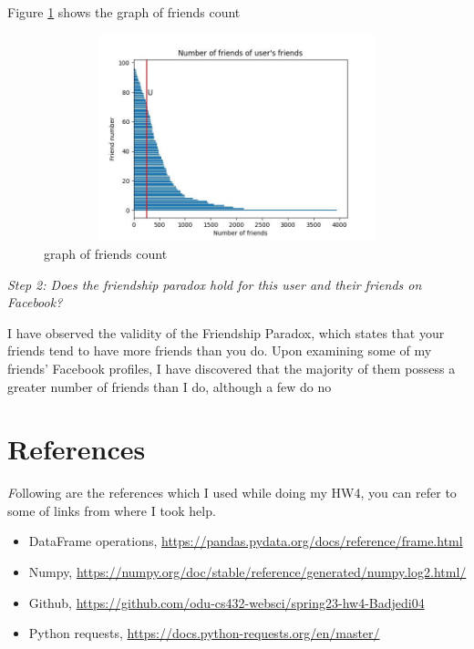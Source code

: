 \documentclass[12pt]{article}
\begin{document}
Figure \ref{fig:graph} shows the graph of friends count

\begin{figure}[h]
    \centering
    \includegraphics[trim=0 0 0 0, clip, width=1.2\textwidth,height=6cm] {1.jpeg}
    \caption{graph of friends count}
    \label{fig:graph}
\end{figure}

\emph{Step 2: Does the friendship paradox hold for this user and their friends on Facebook?}

I have observed the validity of the Friendship Paradox, which states that your friends tend to have more friends than you do. Upon examining some of my friends' Facebook profiles, I have discovered that the majority of them possess a greater number of friends than I do, although a few do no



\section*{References}
\emph Following are the references which I used while doing my HW4, you can refer to some of links from where I took help.

\begin{itemize}
    \item {DataFrame operations, \url{https://pandas.pydata.org/docs/reference/frame.html}}
    \item {Numpy, \url{https://numpy.org/doc/stable/reference/generated/numpy.log2.html/}}
    \item {Github, \url{https://github.com/odu-cs432-websci/spring23-hw4-Badjedi04}}
    \item {Python requests, \url{https://docs.python-requests.org/en/master/}}
\end{itemize}
\end{document}
